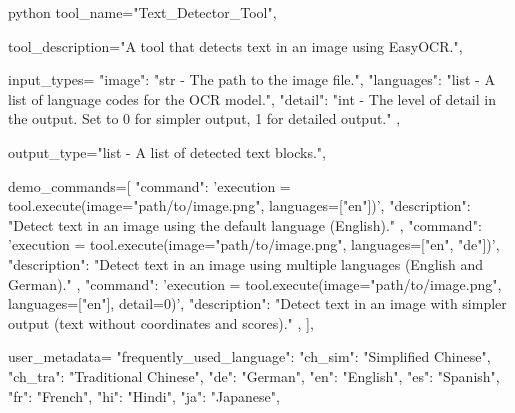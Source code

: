 \begin{codecolorbox}{python}
tool_name="Text_Detector_Tool",

tool_description="A tool that detects text in an image using EasyOCR.",

input_types={
    "image": "str - The path to the image file.",
    "languages": "list - A list of language codes for the OCR model.",
    "detail": "int - The level of detail in the output. Set to 0 for simpler output, 1 for detailed output."
},

output_type="list - A list of detected text blocks.",

demo_commands=[
    {
        "command": 'execution = tool.execute(image="path/to/image.png", languages=["en"])',
        "description": "Detect text in an image using the default language (English)."
    },
    {
        "command": 'execution = tool.execute(image="path/to/image.png", languages=["en", "de"])',
        "description": "Detect text in an image using multiple languages (English and German)."
    },
    {
        "command": 'execution = tool.execute(image="path/to/image.png", languages=["en"], detail=0)',
        "description": "Detect text in an image with simpler output (text without coordinates and scores)."
    },
],

user_metadata={
    "frequently_used_language": {
        "ch_sim": "Simplified Chinese",
        "ch_tra": "Traditional Chinese",
        "de": "German",
        "en": "English",
        "es": "Spanish",
        "fr": "French",
        "hi": "Hindi",
        "ja": "Japanese",
    }
}
\end{codecolorbox}



